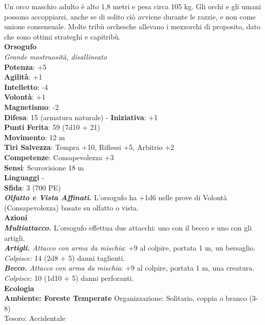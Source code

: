 \begin{multicols}{2}
Un orco maschio adulto è alto 1,8 metri e pesa circa 105 kg. Gli orchi e gli umani possono accoppiarsi, anche se di solito ciò avviene durante le razzie, e non come unione consensuale. Molte tribù orchesche allevano i mezzorchi di proposito, dato che sono ottimi strateghi e capitribù.\\


\medskip\textbf{Orsogufo}\\
\emph{Grande mostruosità, disallineato}\\
\textbf{Potenza}: +5\\
\textbf{Agilità}: +1\\
\textbf{Intelletto}: -4\\
\textbf{Volontà}: +1\\
\textbf{Magnetismo}: -2\\
\textbf{Difesa}: 15 (armatura naturale) - \textbf{Iniziativa}: +1\\
\textbf{Punti Ferita}: 59 (7d10 + 21)\\
\textbf{Movimento}: 12 m\\
\textbf{Tiri Salvezza}: Tempra +10, Riflessi +5, Arbitrio +2\\
\textbf{Competenze}: Consapevolezza +3\\
\textbf{Sensi}: Scurovisione 18 m\\
\textbf{Linguaggi} -\\
\textbf{Sfida}: 3 (700 PE)\smallskip\\
\emph{\textbf{Olfatto e Vista Affinati.}} L'orsogufo ha +1d6 nelle prove di Volontà (Consapevolezza) basate su olfatto o vista.\\
\smallskip\textbf{Azioni}\\
\emph{\textbf{Multiattacco.}} L'orsogufo effettua due attacchi: uno con il becco e uno con gli artigli.\\
\emph{\textbf{Artigli.} Attacco con arma da mischia}: +9 al colpire, portata 1 m, un bersaglio.\\
\emph{Colpisce:} 14 (2d8 + 5) danni taglienti.\\
\emph{\textbf{Becco.} Attacco con arma da mischia}: +9 al colpire, portata 1 m, una creatura.\\
\emph{Colpisce:} 10 (1d10 + 5) danni perforanti.\\
\textbf{Ecologia}\\
\textbf{Ambiente: Foreste Temperate}
Organizzazione: Solitario, coppia o branco (3-8)\\
Tesoro: Accidentale\\

\end{multicols}
